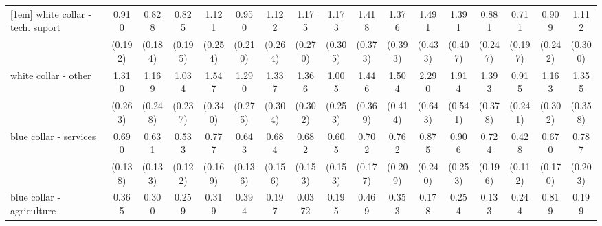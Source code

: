 {\begin{tabular}{l*{16}{c}}
[1em]
white collar - tech. suport&       0.910         &       0.828         &       0.825         &       1.121         &       0.950         &       1.122         &       1.175         &       1.173         &       1.418         &       1.376         &       1.491         &       1.391         &       0.881         &       0.711         &       0.909         &       1.112         \\
                    &     (0.192)         &     (0.184)         &     (0.195)         &     (0.254)         &     (0.210)         &     (0.264)         &     (0.270)         &     (0.305)         &     (0.373)         &     (0.393)         &     (0.433)         &     (0.407)         &     (0.247)         &     (0.197)         &     (0.242)         &     (0.300)         \\
[1em]
white collar - other&       1.310         &       1.169         &       1.034         &       1.547\sym{*}  &       1.290         &       1.337         &       1.366         &       1.005         &       1.446         &       1.504         &       2.290\sym{**} &       1.914\sym{*}  &       1.393         &       0.915         &       1.163         &       1.355         \\
                    &     (0.263)         &     (0.248)         &     (0.237)         &     (0.340)         &     (0.275)         &     (0.304)         &     (0.302)         &     (0.253)         &     (0.369)         &     (0.414)         &     (0.643)         &     (0.541)         &     (0.378)         &     (0.241)         &     (0.302)         &     (0.358)         \\
[1em]
blue collar - services&       0.690         &       0.631\sym{*}  &       0.533\sym{**} &       0.777         &       0.643\sym{*}  &       0.684         &       0.682         &       0.605\sym{*}  &       0.702         &       0.762         &       0.875         &       0.906         &       0.724         &       0.428\sym{**} &       0.670         &       0.787         \\
                    &     (0.138)         &     (0.133)         &     (0.122)         &     (0.169)         &     (0.136)         &     (0.156)         &     (0.153)         &     (0.153)         &     (0.177)         &     (0.209)         &     (0.240)         &     (0.253)         &     (0.196)         &     (0.112)         &     (0.170)         &     (0.203)         \\
[1em]
blue collar - agriculture&       0.365         &       0.300         &       0.259\sym{*}  &       0.319         &       0.394         &       0.197\sym{*}  &      0.0372\sym{***}&       0.195\sym{**} &       0.469         &       0.353         &       0.178\sym{*}  &       0.254         &       0.133\sym{*}  &       0.244\sym{*}  &       0.819         &       0.199\sym{**} \\

\end{tabular}}
